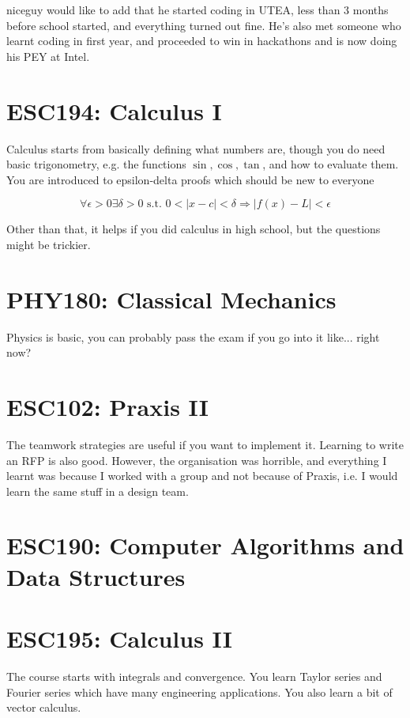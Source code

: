 niceguy would like to add that he started coding in UTEA, less than 3 months before school started, and everything turned out fine. He's also met someone who learnt coding in first year, and proceeded to win in hackathons and is now doing his PEY at Intel.

\section{ESC194: Calculus I}

Calculus starts from basically defining what numbers are, though you do need basic trigonometry, e.g. the functions $\sin, \cos, \tan$, and how to evaluate them. You are introduced to epsilon-delta proofs which should be new to everyone

$$\forall \epsilon > 0 \exists \delta > 0 \text{ s.t. } 0 < |x-c| < \delta \Rightarrow |f(x)-L| < \epsilon$$

Other than that, it helps if you did calculus in high school, but the questions might be trickier.

\section{PHY180: Classical Mechanics}

Physics is basic, you can probably pass the exam if you go into it like... right now?

\section{ESC102: Praxis II}

The teamwork strategies are useful if you want to implement it. Learning to write an RFP is also good. However, the organisation was horrible, and everything I learnt was because I worked with a group and not because of Praxis, i.e. I would learn the same stuff in a design team.

\section{ESC190: Computer Algorithms and Data Structures}

\section{ESC195: Calculus II}

The course starts with integrals and convergence. You learn Taylor series and Fourier series which have many engineering applications. You also learn a bit of vector calculus.


